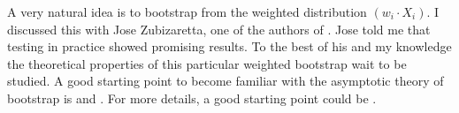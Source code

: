 A very natural idea is to bootstrap from the weighted distribution
$
(w_i\cdot X_i)
$.
I discussed this with Jose Zubizaretta, one of the authors of \cite{Wang2019, Wang2023}.
Jose told me that testing in practice showed promising results.
To the best of his and my knowledge the theoretical properties of this particular weighted bootstrap wait to be studied.
A good starting point to become familiar with the asymptotic theory of bootstrap is \cite[§3.6]{vaart2013} and \cite[§23]{Vaart2000}.
For more details, a good starting point could be \cite{Barbe95}.
